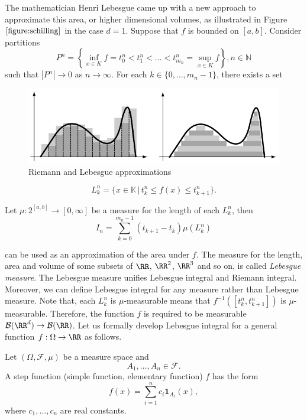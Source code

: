 The mathematician Henri Lebesgue came up with a new approach to approximate this area, or higher dimensional volumes, as illustrated in Figure $\ref{figure:schilling}$ in the case $d=1$. Suppose that $f$ is bounded on $[a,b]$. Consider partitions $$P^n=\left\{\inf\limits_{x\in K} f=t^n_0<t^n_1<\ldots<t^n_{m_n}=\sup\limits_{x\in K} f\right\}, n\in\mathbb{N}$$ such that $|P^n|\to 0$ as $n\to\infty$. For each $k\in\{0,\ldots,m_n-1\}$, there exists a set

\begin{figure}
  \centering
  \includegraphics[width=0.75\linewidth]{img/riemann-vs-lebesgue.png}
  \vspace{0.5cm}
  \caption[Riemann and Lebesgue approximations]{Riemann and Lebesgue approximations \cite{schilling2017measures}}
  \label{figure:schilling}
\end{figure}



$$L_k^n=\{x\in\mathbb{K} \,|\, t_k^n\le f(x)\le t_{k+1}^n\}.$$

Let $\mu:2^{[a,b]}\to[0,\infty]$ be a measure for the length of each $L_k^n$, then
\begin{equation}
  I_n=\sum\limits_{k=0}^{m_n-1}(t_{k+1}-t_k)\mu(L_k^n)
\end{equation}

can be used as an approximation of the area under $f$. The measure for the length, area and volume of some subsets of $\RR$, $\RR^2$, $\RR^3$ and so on, is called \textit{Lebesgue measure}. The Lebesgue measure unifies Lebesgue integral and Riemann integral. Moreover, we can define Lebesgue integral for any measure rather than Lebesgue measure. Note that, each $L^n_k$ is $\mu$-measurable means that $f^{-1}([t_k^n, t^n_{k+1}])$ is $\mu$-measurable. Therefore, the function $f$ is required to be measurable $\mathcal{B}(\RR^d)\to\mathcal{B}(\RR)$. Let us formally develop Lebesgue integral for a general function $f:\Omega\to\RR$ as follows.

\begin{definition}
  Let $(\Omega, \mathcal{F}, \mu)$ be a measure space and $$A_1,\ldots,A_n\in\mathcal{F}.$$ A  step function (simple function, elementary function) $f$ has the form
  \begin{equation}
    f(x)=\sum\limits_{i=1}^nc_i\mathbf{1}_{A_i}(x),
  \end{equation}
  where $c_1,\ldots,c_n$ are real constants.
\end{definition}

